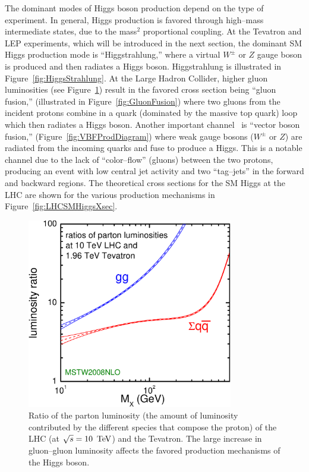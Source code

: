The dominant modes of Higgs boson production depend on the type of experiment.
In general, Higgs production is favored through high--mass intermediate states,
due to the mass$^2$ proportional coupling.  At the Tevatron and LEP experiments,
which will be introduced in the next section, the dominant SM Higgs production
mode is ``Higgstrahlung,'' where a virtual $W^\pm$ or $Z$ gauge boson is
produced and then radiates a Higgs boson.  Higgstrahlung is illustrated in
Figure~\ref{fig:HiggsStrahlung}.  At the Large Hadron Collider, higher gluon
luminosities (see Figure~\ref{fig:GluonLumiRatio}) result in the favored cross
section being ``gluon fusion,'' (illustrated in Figure~\ref{fig:GluonFusion})
where two gluons from the incident protons combine in a quark (dominated by the
massive top quark) loop which then radiates a Higgs boson.  Another important
channel~\cite{Rainwater:1998kj} is ``vector boson fusion,''
(Figure~\ref{fig:VBFProdDiagram}) where weak gauge bosons ($W^\pm$ or $Z$) are
radiated from the incoming quarks and fuse to produce a Higgs.  This is a
notable channel due to the lack of ``color--flow'' (gluons) between the two
protons, producing an event with low central jet activity and two ``tag--jets''
in the forward and backward regions.  The theoretical cross sections for the SM
Higgs at the LHC are shown for the various production mechanisms in
Figure~\ref{fig:LHCSMHiggsXsec}.
\begin{figure}
  \centering
  \includegraphics[width=90mm,angle=0]{theory_chapter/figures/parton_lumis_10TeV_vs_2TeV.pdf}
  \caption[Parton luminosity comparison of the LHC and Tevatron]{Ratio of the
  parton luminosity (the amount of luminosity contributed by the different
  species that compose the proton) of the LHC (at \mbox{$\sqrt s = 10~\,\text{Te\hspace{-.08em}V}$}) and the
  Tevatron.  The large increase in gluon--gluon luminosity affects the favored
  production mechanisms of the Higgs boson.  } \label{fig:GluonLumiRatio}
\end{figure}
